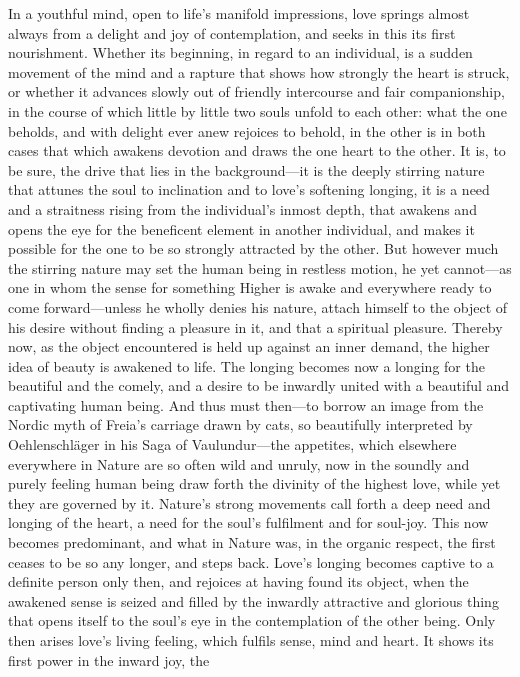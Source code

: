 \documentclass[12pt,a4paper]{book}
\begin{document}
In a youthful mind, open to life's manifold impressions, love springs
almost always from a delight and joy of contemplation, and seeks in this
its first nourishment. Whether its beginning, in regard to an individual,
is a sudden movement of the mind and a rapture that shows how strongly the
heart is struck, or whether it advances slowly out of friendly intercourse
and fair companionship, in the course of which little by little two souls
unfold to each other: what the one beholds, and with delight ever anew
rejoices to behold, in the other is in both cases that which awakens
devotion and draws the one heart to the other. It is, to be sure, the
drive that lies in the background---it is the deeply stirring nature that
attunes the soul to inclination and to love's softening longing, it is a
need and a straitness rising from the individual's inmost depth, that
awakens and opens the eye for the beneficent element in another
individual, and makes it possible for the one to be so strongly attracted
by the other. But however much the stirring nature may set the human being
in restless motion, he yet cannot---as one in whom the sense for something
Higher is awake and everywhere ready to come forward---unless he wholly
denies his nature, attach himself to the object of his desire without
finding a pleasure in it, and that a spiritual pleasure. Thereby now, as
the object encountered is held up against an inner demand, the higher idea
of beauty is awakened to life. The longing becomes now a longing for the
beautiful and the comely, and a desire to be inwardly united with a
beautiful and captivating human being. And thus must then---to borrow an
image from the Nordic myth of Freia's carriage drawn by cats, so
beautifully interpreted by Oehlenschläger in his Saga of Vaulundur---the
appetites, which elsewhere everywhere in Nature are so often wild and
unruly, now in the soundly and purely feeling human being draw forth the
divinity of the highest love, while yet they are governed by it. Nature's
strong movements call forth a deep need and longing of the heart, a need
for the soul's fulfilment and for soul-joy. This now becomes predominant,
and what in Nature was, in the organic respect, the first ceases to be so
any longer, and steps back. Love's longing becomes captive to a definite
person only then, and rejoices at having found its object, when the
awakened sense is seized and filled by the inwardly attractive and
glorious thing that opens itself to the soul's eye in the contemplation of
the other being. Only then arises love's living feeling, which fulfils
sense, mind and heart. It shows its first power in the inward joy, the
\end{document}
